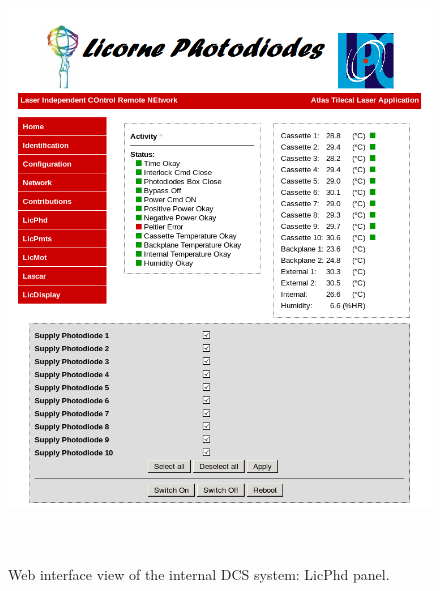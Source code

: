 \begin{appendices}
\newpage


\begin{figure}[htbp]
\centering
\includegraphics[height=16cm]{figures/licorne_web1.png}
\caption{Web interface view of the internal DCS system: LicPhd panel.}\label{fig:licorne_weba}
\end{figure}


\end{appendices}
